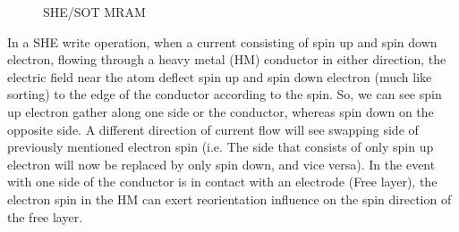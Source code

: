 \begin{figure}[H]
	\centering
	\caption{SHE/SOT MRAM}
	\label{fig:sttshe}
\end{figure}

In a SHE write operation, when a current consisting of spin up and spin down electron, flowing through a heavy metal (HM) conductor in either direction, the electric field near the atom deflect spin up and spin down electron (much like sorting) to the edge of the conductor according to the spin. So, we can see spin up electron gather along one side or the conductor, whereas spin down on the opposite side. A different direction of current flow will see swapping side of previously mentioned electron spin (i.e. The side that consists of only spin up electron will now be replaced by only spin down, and vice versa). In the event with one side of the conductor is in contact with an electrode (Free layer), the electron spin in the HM can exert reorientation influence on the spin direction of the free layer.

